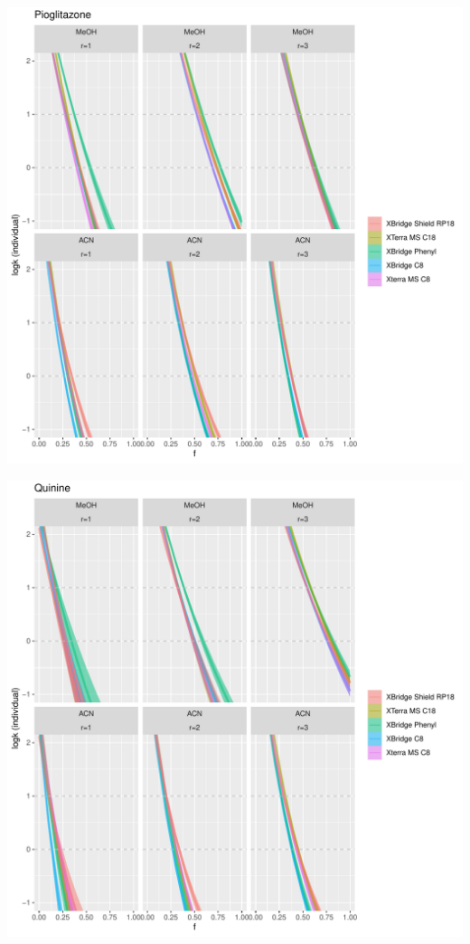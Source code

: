 \documentclass[
]{article}
\begin{document}
\newpage{}

\includegraphics{../figures/izoparam/isopred/Pioglitazone.individual.pdf}

\newpage{}

\includegraphics{../figures/izoparam/isopred/Quinine.individual.pdf}
\end{document}
